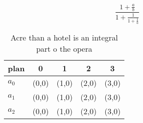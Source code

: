 \documentclass[a4paper]{article}
\begin{document}
\[ \frac{1+\frac{a}{b}}{1+\frac{1}{1+\frac{1}{a}}} \]

\begin{table}
\begin{adjustbox}{width=0.6\columnwidth}
\begin{tabular}{|l|l|l|l|l|}
\hline
\textbf{plan} & \multicolumn{1}{c|}{\textbf{0}} & \multicolumn{1}{c|}{\textbf{1}} & \multicolumn{1}{c|}{\textbf{2}} & \multicolumn{1}{c|}{\textbf{3}} \\ \hline
\textbf{$a_0$}  & (0,0) & (1,0) & (2,0) & (3,0) \\ \hline
\textbf{$a_1$}  & (0,0) & (1,0) & (2,0) & (3,0) \\ \hline
\textbf{$a_2$}  & (0,0) & (1,0) & (2,0) & (3,0) \\ \hline
\end{tabular}
\end{adjustbox}
\caption{Acre than a hotel is an integral part o the opera
}
\end{table}
\end{document}
